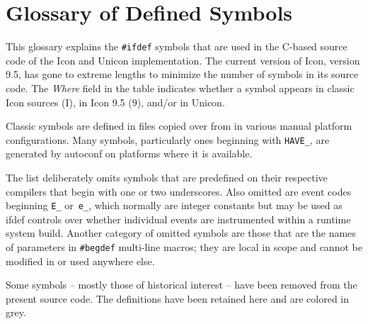 \chapter{Glossary of Defined Symbols}

This glossary explains the \texttt{\#ifdef} symbols that are used in the
C-based source code of the Icon and Unicon implementation.  The
current version of Icon, version 9.5, has gone to extreme lengths
to minimize the number of symbols in its source code. The {\em Where\/}
field in the table indicates whether a symbol appears in classic Icon
sources (I), in Icon 9.5 (9), and/or in Unicon.

Classic symbols are defined in  files copied over from
 in various manual platform configurations.
Many symbols, particularly ones beginning with \texttt{HAVE\_}, are
generated by autoconf on platforms where it is available.

The list deliberately omits symbols that are predefined on their
respective compilers that begin with one or two underscores. Also
omitted are event codes beginning \texttt{E\_} or\texttt{ e\_}, which normally are
integer constants but may be used as ifdef controls over whether
individual events are instrumented within a runtime system build.
Another category of omitted symbols are those that are the names
of parameters in \texttt{\#begdef} multi-line macros; they are local in
scope and cannot be modified in  or used anywhere else.

Some symbols -- mostly those of historical interest --  have been removed from
the present source code. The definitions have been retained here and are colored
in {\gr grey}.
\bigskip

